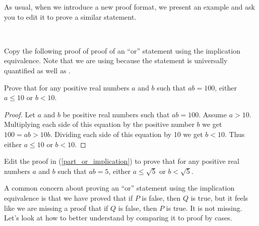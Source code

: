 As usual, when we introduce a new proof format, we present an example and ask you to edit it to prove a similar statement.

\begin{act}
\label{act_pff_implication}
~
    \begin{actpart}
        \item \label{part_or_implication} Copy the following proof of proof of an ``or'' statement using the implication equivalence.  Note that we are using  because the statement is universally quantified as well as  .

        Prove that for any positive real numbers $a$ and $b$ such that $ab=100$, either $a \le 10$ or $b < 10$.
            \begin{proof}
                Let $a$ and $b$ be positive real numbers such that $ab = 100$. Assume $a > 10$.  Multiplying each side of this equation by the positive number $b$ we get $100=ab > 10b$.  Dividing each side of this equation by 10 we get $b < 10$. Thus either $a \le 10$ or $b < 10$.
            \end{proof}

        \item Edit the proof in (\ref{part_or_implication}) to prove that for any positive real numbers $a$ and $b$ such that $ab=5$, either $a \le \sqrt{5}$ or $b < \sqrt{5}$. 
    \end{actpart}
\end{act}

A common concern about proving an ``or'' statement using the implication equivalence is that we have proved that if $P$ is false, then $Q$ is true, but it feels like we are missing a proof that if $Q$ is false, then $P$ is true.  It is not missing.  Let's look at how to better understand  by comparing it to proof by cases.

